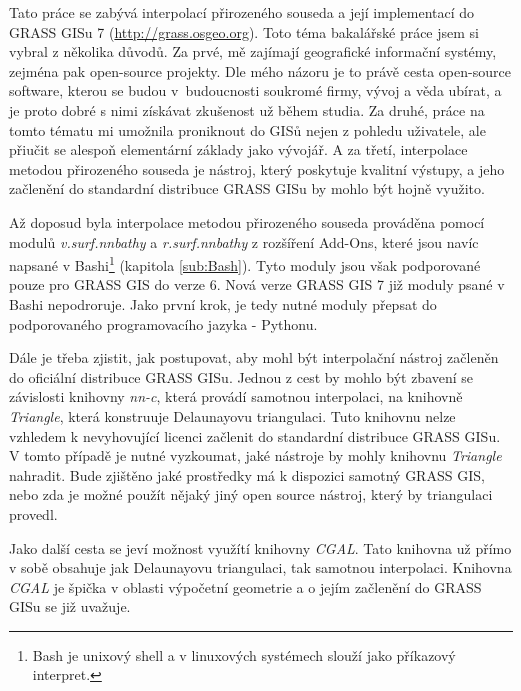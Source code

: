 \documentclass[12pt,a4paper]{article}
\begin{document}
\bigskip

Tato práce se zabývá interpolací přirozeného souseda a její
implementací do GRASS GISu 7 (\url{http://grass.osgeo.org}).
Toto téma bakalářské práce jsem si vybral z několika důvodů. Za prvé,
mě zajímají geografické informační systémy, zejména pak open-source
projekty. Dle mého názoru je to právě cesta open-source software,
kterou se budou v~budoucnosti soukromé firmy, vývoj a věda ubírat, a
je proto dobré s nimi získávat zkušenost už během studia. Za druhé,
práce na tomto tématu mi umožnila proniknout do GISů nejen z pohledu
uživatele, ale přiučit se alespoň elementární základy jako vývojář. A
za třetí, interpolace metodou přirozeného souseda je nástroj, který
poskytuje kvalitní výstupy, a jeho začlenění do standardní distribuce
GRASS GISu by mohlo být hojně využito.

Až doposud byla interpolace metodou přirozeného souseda prováděna
pomocí modulů \emph{v.surf.nnbathy} a \emph{r.surf.nnbathy} z
rozšíření Add-Ons, které jsou navíc napsané v Bashi\footnote{Bash je unixový shell a v linuxových systémech slouží jako příkazový interpret.} (kapitola \ref{sub:Bash}). Tyto moduly jsou
však podporované pouze pro GRASS GIS do verze 6. Nová verze GRASS GIS
7 již moduly psané v Bashi nepodroruje. Jako první krok, je tedy
nutné moduly přepsat do podporovaného programovacího jazyka - Pythonu.

\newpage

Dále je třeba zjistit, jak postupovat, aby mohl být interpolační
nástroj začleněn do oficiální distribuce GRASS GISu. Jednou z cest by
mohlo být zbavení se závislosti knihovny \emph{nn-c}, která provádí
samotnou interpolaci, na knihovně \emph{Triangle}, která konstruuje
Delaunayovu triangulaci. Tuto knihovnu nelze vzhledem k nevyhovující
licenci začlenit do standardní distribuce GRASS GISu. V tomto případě
je nutné vyzkoumat, jaké nástroje by mohly knihovnu \emph{Triangle}
nahradit. Bude zjištěno jaké prostředky má k dispozici samotný GRASS
GIS, nebo zda je možné použít nějaký jiný open source nástroj, který
by triangulaci provedl.

Jako další cesta se jeví možnost využítí knihovny \emph{CGAL}. Tato
knihovna už přímo v sobě obsahuje jak Delaunayovu triangulaci, tak
samotnou interpolaci. Knihovna \emph{CGAL} je špička v oblasti
výpočetní geometrie a o jejím začlenění do GRASS GISu se již uvažuje.
\end{document}
